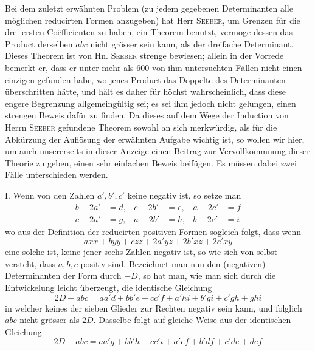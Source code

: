 Bei dem zuletzt erwähnten Problem (zu jedem gegebenen Determinanten alle möglichen reducirten Formen anzugeben) hat Herr \textsc{Seeber}, um Grenzen für die drei ersten Coëfficienten zu haben, ein Theorem benutzt, vermöge dessen das Product derselben $abc$ nicht grösser sein kann, als der dreifache Determinant. Dieses Theorem ist von Hn. \textsc{Seeber} strenge bewiesen; allein in der Vorrede bemerkt er, dass er unter mehr als 600 von ihm untersuchten Fällen nicht einen einzigen gefunden habe, wo jenes Product das Doppelte des Determinanten überschritten hätte, und hält es daher für höchst wahrscheinlich, dass diese engere Begrenzung allgemeingültig sei; es sei ihm jedoch nicht gelungen, einen strengen Beweis dafür zu finden. Da dieses auf dem Wege der Induction von Herrn \textsc{Seeber} gefundene Theorem sowohl an sich merkwürdig, als für die Abkürzung der Auflösung der erwähnten Aufgabe wichtig ist, so wollen wir hier, um auch unsererseits in dieser Anzeige einen Beitrag zur Vervollkommnung dieser Theorie zu geben, einen sehr einfachen Beweis beifügen. Es müssen dabei zwei Fälle unterschieden werden.

I. Wenn von den Zahlen $a',b',c'$ keine negativ ist, so setze man
\[
\begin{aligned}
b-2a'&=d,&c-2b'&=e,&a-2c'&=f\\
c-2a'&=g,&a-2b'&=h,&b-2c'&=i
\end{aligned}
\]
wo aus der Definition der reducirten positiven Formen sogleich folgt, dass wenn
\[
axx+byy+czz+2a'yz+2b'xz+2c'xy
\]
eine solche ist, keine jener sechs Zahlen negativ ist, so wie sich von selbst versteht, dass $a,b,c$ positiv sind. Bezeichnet man nun den (negativen) 
Determinanten der Form durch $-D$, so hat man, wie man sich durch die Entwickelung leicht überzeugt, die identische Gleichung
\[
2D-abc=aa'd+bb'e+cc'f+a'hi+b'gi+c'gh+ghi
\]
in welcher keines der sieben Glieder zur Rechten negativ sein kann, und folglich $abc$ nicht grösser als $2D$. Dasselbe folgt auf gleiche Weise aus der identischen Gleichung
\[
2D-abc=aa'g+bb'h+cc'i+a'ef+b'df+c'de+def
\]

